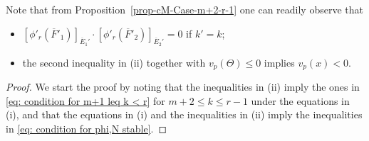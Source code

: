 \documentclass[11pt]{amsart}
\theoremstyle{definition}
\numberwithin{equation}{subsection}
\theoremstyle{plain}
\theoremstyle{plain}
\theoremstyle{plain}
\theoremstyle{plain}
\theoremstyle{plain}
\theoremstyle{plain}
\theoremstyle{plain}
\theoremstyle{plain}
\theoremstyle{plain}
\theoremstyle{plain}
\theoremstyle{plain}
\theoremstyle{plain}
\theoremstyle{definition}
\theoremstyle{definition}
\theoremstyle{definition}
\theoremstyle{remark}
\renewcommand{\(}{\textup{(}}
\renewcommand{\)}{\textup{)}}
\newcommand{\barE}{\overline{E}}
\newcommand{\barF}{\overline{F}}
\begin{document}
Note that from Proposition~\ref{prop-cM-Case-m+2-r-1} one can readily observe that
\begin{itemize}[leftmargin=*]
\item $[\phi'_r(\barF'_1)]_{\barE_1'}\cdot [\phi'_r(\barF'_2)]_{\barE_2'}=0$ if $k'=k$;
\item the second inequality in (ii) together with $v_p(\Theta)\leq 0$ implies $v_p(x)<0$.
\end{itemize}

\begin{proof}
We start the proof by noting that the inequalities in (ii) imply the ones in \eqref{eq: condition for m+1 leq k < r} for $m+2\leq k\leq r-1$ under the equations in (i), and that the equations in (i) and the inequalities in (ii) imply the inequalities in \eqref{eq: condition for phi,N stable}.




\end{proof}
\end{document}

